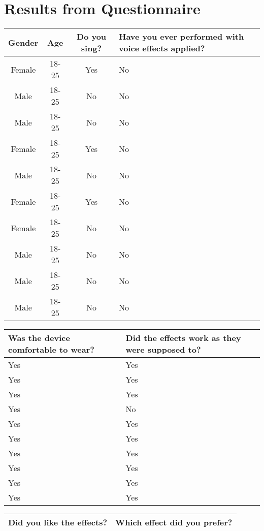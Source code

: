 \section{Results from Questionnaire}\label{QResults}
\begin{center}

\begin{tabular}{| c | c | c | p{5cm} | }
\hline
Gender & Age & Do you sing? & Have you ever performed with voice effects applied? \\ \hline
Female & 18-25 & Yes & No \\ \hline
Male & 18-25 & No & No \\ \hline
Male & 18-25 & No & No \\ \hline
Female & 18-25 & Yes & No \\ \hline
Male & 18-25 & No & No \\ \hline
Female & 18-25 & Yes & No \\ \hline
Female & 18-25 & No & No \\ \hline
Male & 18-25 & No & No \\ \hline
Male & 18-25 & No & No \\ \hline
Male & 18-25 & No & No \\ \hline
\end{tabular}
\newline
\vspace*{1 cm}
\newline
\begin{tabular}{| p{5cm} |  p{5cm} |}
\hline
Was the device comfortable to wear? & Did the effects work as they were supposed to?  \\ \hline
Yes & Yes   \\ \hline
Yes & Yes  \\ \hline
Yes & Yes\\ \hline
Yes & No  \\ \hline
Yes & Yes \\ \hline
Yes & Yes  \\ \hline
Yes & Yes  \\ \hline
Yes & Yes  \\ \hline
Yes & Yes  \\ \hline
Yes & Yes \\ \hline
\end{tabular}
\newline
\vspace*{1 cm}
\newline
\begin{tabular}{| c |  c |}
\hline
Did you like the effects? & Which effect did you prefer? \\ \hline

\end{tabular}
\end{center}
